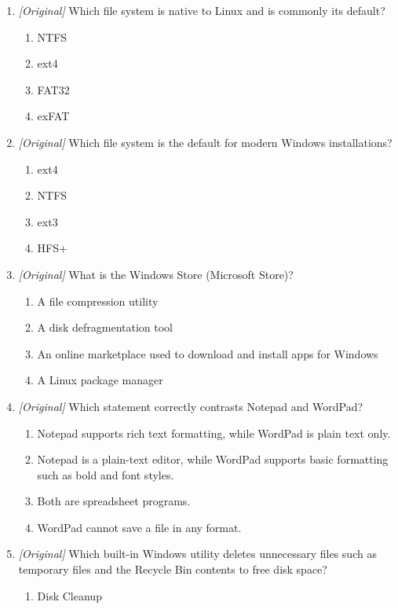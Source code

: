\begin{enumerate}[label=\textbf{Q\arabic*.}, leftmargin=*]
\item \textit{[Original]} Which file system is native to Linux and is commonly
  its default?
  \begin{enumerate}[label=\Alph*.]
    \item NTFS
    \item ext4
    \item FAT32
    \item exFAT
  \end{enumerate}
\item \textit{[Original]} Which file system is the default for modern Windows
  installations?
  \begin{enumerate}[label=\Alph*.]
    \item ext4
    \item NTFS
    \item ext3
    \item HFS+
  \end{enumerate}
\item \textit{[Original]} What is the Windows Store (Microsoft Store)?
  \begin{enumerate}[label=\Alph*.]
    \item A file compression utility
    \item A disk defragmentation tool
    \item An online marketplace used to download and install apps for Windows
    \item A Linux package manager
  \end{enumerate}
\item \textit{[Original]} Which statement correctly contrasts Notepad and
  WordPad?
  \begin{enumerate}[label=\Alph*.]
    \item Notepad supports rich text formatting, while WordPad is plain text
      only.
    \item Notepad is a plain-text editor, while WordPad supports basic
      formatting such as bold and font styles.
    \item Both are spreadsheet programs.
    \item WordPad cannot save a file in any format.
  \end{enumerate}
\item \textit{[Original]} Which built-in Windows utility deletes unnecessary
  files such as temporary files and the Recycle Bin contents to free disk
  space?
  \begin{enumerate}[label=\Alph*.]
    \item Disk Cleanup

\end{enumerate}
\end{enumerate}
